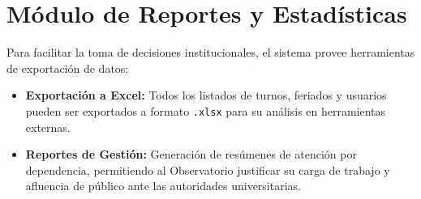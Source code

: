 \section{Módulo de Reportes y Estadísticas}
Para facilitar la toma de decisiones institucionales, el sistema provee herramientas de exportación de datos:
\begin{itemize}
    \item \textbf{Exportación a Excel:} Todos los listados de turnos, feriados y usuarios pueden ser exportados a formato \texttt{.xlsx} para su análisis en herramientas externas.
    \item \textbf{Reportes de Gestión:} Generación de resúmenes de atención por dependencia, permitiendo al Observatorio justificar su carga de trabajo y afluencia de público ante las autoridades universitarias.
\end{itemize}
